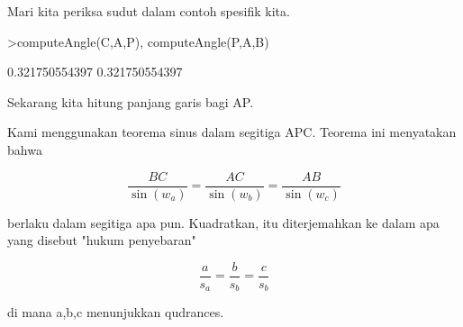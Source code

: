 \documentclass[a4paper,10pt]{article}
\begin{document}
\begin{eulernotebook}
\begin{eulercomment}
\begin{eulercomment}
\begin{eulercomment}
Mari kita periksa sudut dalam contoh spesifik kita.
\end{eulercomment}
\begin{eulerprompt}
>computeAngle(C,A,P), computeAngle(P,A,B)
\end{eulerprompt}
\begin{euleroutput}
  0.321750554397
  0.321750554397
\end{euleroutput}
\begin{eulercomment}
Sekarang kita hitung panjang garis bagi AP.

Kami menggunakan teorema sinus dalam segitiga APC. Teorema ini
menyatakan bahwa

\end{eulercomment}
\begin{eulerformula}
\[
\frac{BC}{\sin(w_a)} = \frac{AC}{\sin(w_b)} = \frac{AB}{\sin(w_c)}
\]
\end{eulerformula}
\begin{eulercomment}
berlaku dalam segitiga apa pun. Kuadratkan, itu diterjemahkan ke dalam
apa yang disebut "hukum penyebaran"

\end{eulercomment}
\begin{eulerformula}
\[
\frac{a}{s_a} = \frac{b}{s_b} = \frac{c}{s_b}
\]
\end{eulerformula}
\begin{eulercomment}
di mana a,b,c menunjukkan qudrances.


\end{eulercomment}
\end{eulercomment}
\end{eulercomment}
\end{eulernotebook}
\end{document}
